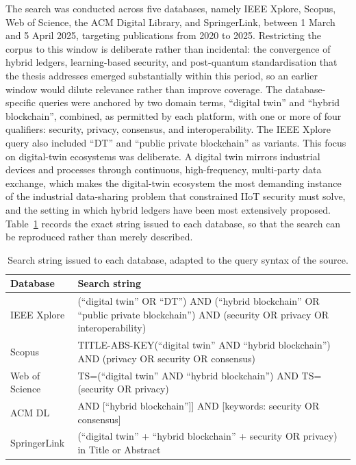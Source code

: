 The search was conducted across five databases, namely IEEE Xplore, Scopus, Web
of Science, the ACM Digital Library, and SpringerLink, between 1 March and
5 April 2025, targeting publications from 2020 to 2025. Restricting the corpus to
this window is deliberate rather than incidental: the convergence of hybrid
ledgers, learning-based security, and post-quantum standardisation that the
thesis addresses emerged substantially within this period, so an earlier window
would dilute relevance rather than improve coverage. The database-specific
queries were anchored by two domain terms, ``digital twin'' and ``hybrid
blockchain'', combined, as permitted by each platform, with one or more of four
qualifiers: security, privacy, consensus, and interoperability. The IEEE Xplore
query also included ``DT'' and ``public private blockchain'' as variants. This
focus on digital-twin ecosystems was deliberate. A digital twin mirrors
industrial devices and processes through continuous,
high-frequency, multi-party data exchange, which makes the digital-twin
ecosystem the most demanding instance of the industrial data-sharing problem
that constrained IIoT security must solve, and the setting in which hybrid
ledgers have been most extensively proposed. Table~\ref{tab:search-strings}
records the exact string issued to each database, so that the search can be
reproduced rather than merely described.

\begin{table}[!htbp]
  \centering
  \footnotesize
  \setlength{\tabcolsep}{4pt}
  \renewcommand{\arraystretch}{1.3}
  \caption{Search string issued to each database, adapted to the query syntax of the source.}
  \label{tab:search-strings}
  \begin{tabularx}{\textwidth}{@{}
      >{\raggedright\arraybackslash}p{2.4cm}
      >{\raggedright\arraybackslash}X@{}}
    \toprule
    \textbf{Database} & \textbf{Search string} \\
    \midrule
    IEEE Xplore   & (``digital twin'' OR ``DT'') AND (``hybrid blockchain'' OR ``public private blockchain'') AND (security OR privacy OR interoperability) \\
    \addlinespace
    Scopus        & TITLE-ABS-KEY(``digital twin'' AND ``hybrid blockchain'') AND (privacy OR security OR consensus) \\
    \addlinespace
    Web of Science & TS=(``digital twin'' AND ``hybrid blockchain'') AND TS=(security OR privacy) \\
    \addlinespace
    ACM DL        & [[Abstract: ``digital twin''] AND [``hybrid blockchain'']] AND [keywords: security OR consensus] \\
    \addlinespace
    SpringerLink  & (``digital twin'' + ``hybrid blockchain'' + security OR privacy) in Title or Abstract \\
    \bottomrule
  \end{tabularx}
\end{table}

